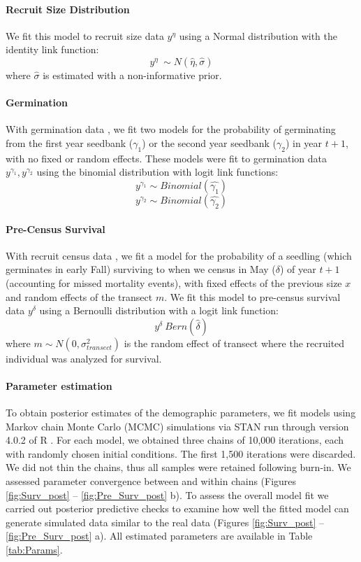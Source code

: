 \documentclass[11pt]{article}
\begin{document}
	
	\paragraph{Recruit Size Distribution}
We fit this model to recruit size data $y^{\eta}$ using a Normal distribution with the identity link function: 
$$y^{\eta} ~\sim N(\hat{\eta},\hat{\sigma})$$
where $\hat{\sigma}$ is estimated with a non-informative prior. 

\paragraph{Germination}
With germination data \cite{Miller2007}, we fit two models for the probability of germinating from the first year seedbank ($\gamma_1$) or the second year seedbank ($\gamma_2$) in year $t+1$, with no fixed or random effects.
These models were fit to germination data $y^{\gamma_1}, y^{\gamma_2}$  using the binomial distribution with logit link functions:
$$y^{\gamma_1} \sim Binomial(\hat{\gamma_1})$$
$$y^{\gamma_2} \sim Binomial(\hat{\gamma_2})$$

\paragraph{Pre-Census Survival}
With recruit census data \cite{Miller2006}, we fit a model for the probability of a seedling (which germinates in early Fall) surviving to when we census in May ($\delta$) of year $t+1$ (accounting for missed mortality events), with fixed effects of the previous size $x$ and random effects of the transect $m$.
We fit this model to pre-census survival data $y^{\delta}$ using a Bernoulli distribution with a logit link function: 
$$y^{\delta} ~ Bern(\hat{\delta})$$
where $m \sim N(0, \sigma_{transect}^2)$ is the random effect of transect where the recruited individual was analyzed for survival.

\paragraph{Parameter estimation}
To obtain posterior estimates of the demographic parameters, we fit models using Markov chain Monte Carlo (MCMC) simulations via STAN run through version 4.0.2 of R \cite{Rcite,Rstancite}. 
For each model, we obtained three chains of 10,000 iterations, each with randomly chosen initial conditions. 
The first 1,500 iterations were discarded. 
We did not thin the chains, thus all samples were retained following burn-in. 
We assessed parameter convergence between and within chains (Figures \ref{fig:Surv_post} -- \ref{fig:Pre_Surv_post} b). 
To assess the overall model fit we carried out posterior predictive checks to examine how well the fitted model can generate simulated data similar to the real data (Figures \ref{fig:Surv_post} -- \ref{fig:Pre_Surv_post} a).
All estimated parameters are available in Table \ref{tab:Params}.
\end{document}
